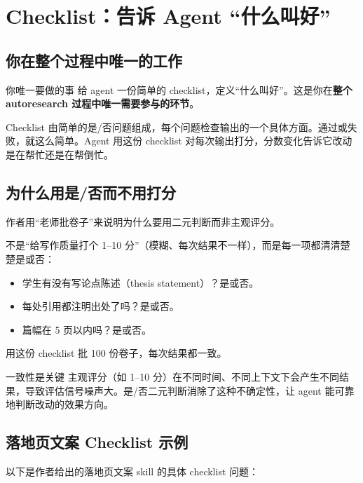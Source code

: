 \section{Checklist：告诉 Agent ``什么叫好''}

\subsection{你在整个过程中唯一的工作}

\begin{importantbox}{你唯一要做的事}
给 agent 一份简单的 checklist，定义``什么叫好''。这是你在\textbf{整个 autoresearch 过程中唯一需要参与的环节}。

Checklist 由简单的是/否问题组成，每个问题检查输出的一个具体方面。通过或失败，就这么简单。Agent 用这份 checklist 对每次输出打分，分数变化告诉它改动是在帮忙还是在帮倒忙。
\end{importantbox}

\subsection{为什么用是/否而不用打分}

作者用``老师批卷子''来说明为什么要用二元判断而非主观评分。

不是``给写作质量打个 1--10 分''（模糊、每次结果不一样），而是每一项都清清楚楚是或否：

\begin{itemize}
    \item 学生有没有写论点陈述（thesis statement）？是或否。
    \item 每处引用都注明出处了吗？是或否。
    \item 篇幅在 5 页以内吗？是或否。
\end{itemize}

用这份 checklist 批 100 份卷子，每次结果都一致。

\begin{knowledgebox}{一致性是关键}
主观评分（如 1--10 分）在不同时间、不同上下文下会产生不同结果，导致评估信号噪声大。是/否二元判断消除了这种不确定性，让 agent 能可靠地判断改动的效果方向。
\end{knowledgebox}

\subsection{落地页文案 Checklist 示例}

以下是作者给出的落地页文案 skill 的具体 checklist 问题：

